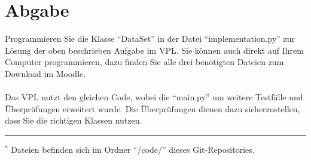 \documentclass[]{article}
\begin{document}
\section{Abgabe}
    Programmieren Sie die Klasse ``DataSet'' in der Datei ``implementation.py'' zur
    Lösung der oben beschrieben Aufgabe im VPL. Sie können auch direkt auf
    Ihrem Computer programmieren, dazu finden Sie alle drei benötigten Dateien
    zum Download im Moodle. \\
    \\
    Das VPL nutzt den gleichen Code, wobei die ``main.py'' um weitere Testfälle und Überprüfungen erweitert wurde.
    Die Überprüfungen dienen dazu sicherzustellen, dass Sie die richtigen Klassen nutzen.\\


\hrule
\vspace{0.5cm}
$^*$ Dateien befinden sich im Ordner ``/code/'' dieses Git-Repositories.\\
\end{document}
